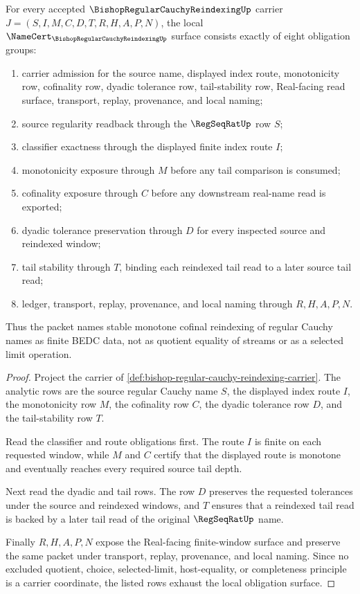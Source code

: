 \begin{theorem}
\label{thm:bishop-regular-cauchy-reindexing-namecert-obligations}
For every accepted $\BishopRegularCauchyReindexingUp$ carrier $J=(S,I,M,C,D,T,R,H,A,P,N)$, the local $\NameCert_{\BishopRegularCauchyReindexingUp}$ surface consists exactly of eight obligation groups:
\begin{enumerate}
\item carrier admission for the source name, displayed index route, monotonicity row, cofinality row, dyadic tolerance row, tail-stability row, Real-facing read surface, transport, replay, provenance, and local naming;
\item source regularity readback through the $\RegSeqRatUp$ row $S$;
\item classifier exactness through the displayed finite index route $I$;
\item monotonicity exposure through $M$ before any tail comparison is consumed;
\item cofinality exposure through $C$ before any downstream real-name read is exported;
\item dyadic tolerance preservation through $D$ for every inspected source and reindexed window;
\item tail stability through $T$, binding each reindexed tail read to a later source tail read;
\item ledger, transport, replay, provenance, and local naming through $R,H,A,P,N$.
\end{enumerate}
Thus the packet names stable monotone cofinal reindexing of regular Cauchy names as finite BEDC data, not as quotient equality of streams or as a selected limit operation.
\end{theorem}
\begin{proof}
Project the carrier of \autoref{def:bishop-regular-cauchy-reindexing-carrier}. The analytic rows are the source regular Cauchy name $S$, the displayed index route $I$, the monotonicity row $M$, the cofinality row $C$, the dyadic tolerance row $D$, and the tail-stability row $T$.

Read the classifier and route obligations first. The route $I$ is finite on each requested window, while $M$ and $C$ certify that the displayed route is monotone and eventually reaches every required source tail depth.

Next read the dyadic and tail rows. The row $D$ preserves the requested tolerances under the source and reindexed windows, and $T$ ensures that a reindexed tail read is backed by a later tail read of the original $\RegSeqRatUp$ name.

Finally $R,H,A,P,N$ expose the Real-facing finite-window surface and preserve the same packet under transport, replay, provenance, and local naming. Since no excluded quotient, choice, selected-limit, host-equality, or completeness principle is a carrier coordinate, the listed rows exhaust the local obligation surface.
\end{proof}

